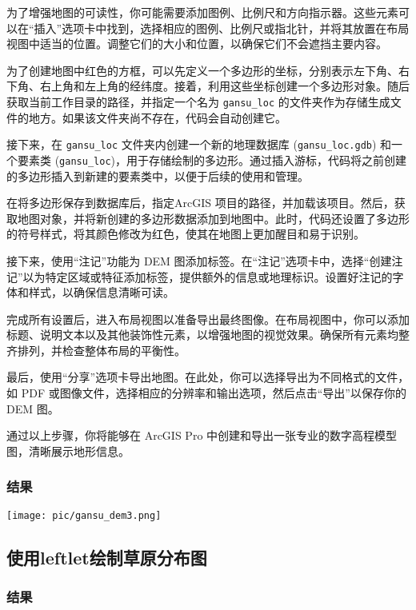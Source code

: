 \documentclass{article}
\begin{document}
		为了增强地图的可读性，你可能需要添加图例、比例尺和方向指示器。这些元素可以在“插入”选项卡中找到，选择相应的图例、比例尺或指北针，并将其放置在布局视图中适当的位置。调整它们的大小和位置，以确保它们不会遮挡主要内容。
		
		为了创建地图中红色的方框，可以先定义一个多边形的坐标，分别表示左下角、右下角、右上角和左上角的经纬度。接着，利用这些坐标创建一个多边形对象。随后获取当前工作目录的路径，并指定一个名为 \texttt{gansu\_loc} 的文件夹作为存储生成文件的地方。如果该文件夹尚不存在，代码会自动创建它。
		
		接下来，在 \texttt{gansu\_loc} 文件夹内创建一个新的地理数据库 (\texttt{gansu\_loc.gdb}) 和一个要素类 (\texttt{gansu\_loc})，用于存储绘制的多边形。通过插入游标，代码将之前创建的多边形插入到新建的要素类中，以便于后续的使用和管理。

		在将多边形保存到数据库后，指定ArcGIS 项目的路径，并加载该项目。然后，获取地图对象，并将新创建的多边形数据添加到地图中。此时，代码还设置了多边形的符号样式，将其颜色修改为红色，使其在地图上更加醒目和易于识别。
		
		接下来，使用“注记”功能为 DEM 图添加标签。在“注记”选项卡中，选择“创建注记”以为特定区域或特征添加标签，提供额外的信息或地理标识。设置好注记的字体和样式，以确保信息清晰可读。
		
		完成所有设置后，进入布局视图以准备导出最终图像。在布局视图中，你可以添加标题、说明文本以及其他装饰性元素，以增强地图的视觉效果。确保所有元素均整齐排列，并检查整体布局的平衡性。
		
		最后，使用“分享”选项卡导出地图。在此处，你可以选择导出为不同格式的文件，如 PDF 或图像文件，选择相应的分辨率和输出选项，然后点击“导出”以保存你的 DEM 图。
		
		通过以上步骤，你将能够在 ArcGIS Pro 中创建和导出一张专业的数字高程模型图，清晰展示地形信息。
		
		
		
				\subsubsection{结果}


			\texttt{[image: pic/gansu\_dem3.png]} %
	\subsection{使用leftlet绘制草原分布图}
	
	
				\subsubsection{结果}
\end{document}
